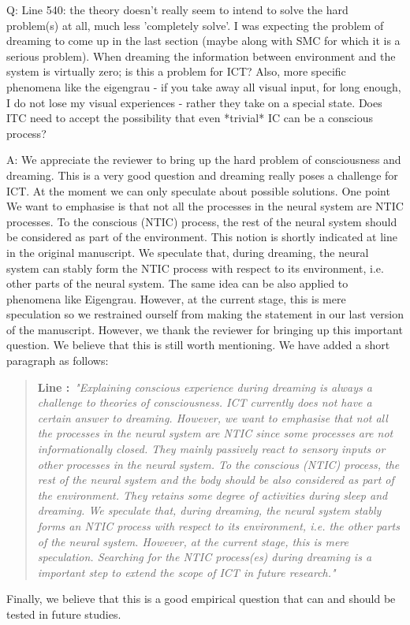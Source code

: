 \documentclass[utf8]{article}
\newcounter{cQuestion}[section]
\newenvironment{question}
    {\refstepcounter{cQuestion}\color{Blue}\noindent\newline Q\thecQuestion:}
    {~\newline}
\newenvironment{ans}  
    {\color{Black}\noindent A:}
    {~\newline}
\newcommand{\addnew}[2]{\blockcquote{}{\textbf{Line #1:}~\newline\textit{"#2"}}
}
\begin{document}
                
        \begin{question}                              
            Line 540: the theory doesn't really seem to intend to solve the hard problem(s) at all, much less 'completely solve'.            
            I was expecting the problem of dreaming to come up in the last section (maybe along with SMC for which it is a serious problem). When dreaming the information between environment and the system is virtually zero; is this a problem for ICT? Also, more specific phenomena like the eigengrau - if you take away all visual input, for long enough, I do not lose my visual experiences - rather they take on a special state. Does ITC need to accept the possibility that even *trivial* IC can be a conscious process?
        \end{question}
    
    	\begin{ans}
    		We appreciate the reviewer to bring up the hard problem of consciousness and dreaming. This is a very good question and dreaming really poses a challenge for ICT. At the moment we can only speculate about possible solutions. One point We want to emphasise is that not all the processes in the neural system are NTIC processes. To the conscious (NTIC) process, the rest of the neural system should be considered as part of the environment. This notion is shortly indicated at line  in the original manuscript. We speculate that, during dreaming, the neural system can stably form the NTIC process with respect to its environment, i.e. other parts of the neural system. The same idea can be also applied to phenomena like Eigengrau. However, at the current stage, this is mere speculation so we restrained ourself from making the statement in our last version of the manuscript. However, we thank the reviewer for bringing up this important question. We believe that this is still worth mentioning. We have added a short paragraph as follows:
    		
            \addnew{}{Explaining conscious experience during dreaming is always a challenge to theories of consciousness. ICT currently does not have a certain answer to dreaming. However, we want to emphasise that not all the processes in the neural system are NTIC since some processes are not informationally closed. They mainly passively react to sensory inputs or other processes in the neural system. To the conscious (NTIC) process, the rest of the neural system and the body should be also considered as part of the environment. They retains some degree of activities during sleep and dreaming. We speculate that, during dreaming, the neural system stably forms an NTIC process with respect to its environment, i.e. the other parts of the neural system. However, at the current stage, this is mere speculation. Searching for the NTIC process(es) during dreaming is a important step to extend the scope of ICT in future research.}
    		    
    		Finally, we believe that this is a good
    		empirical question that can and should be tested in future studies. 
    	\end{ans}

	
\end{document}
